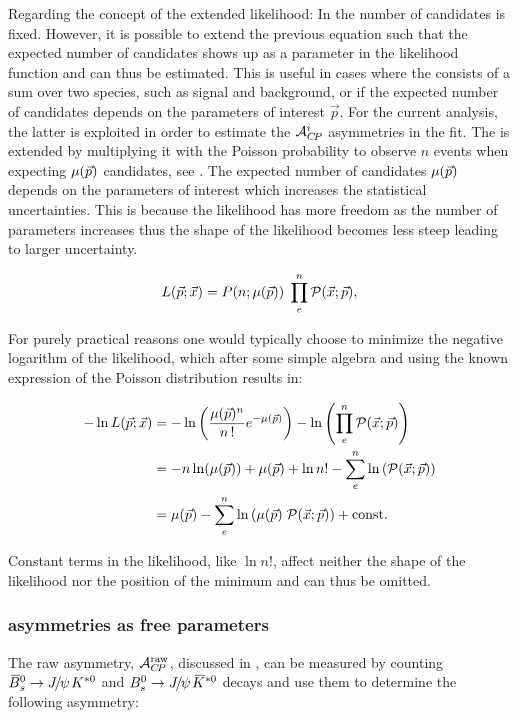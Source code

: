 Regarding the concept of the extended likelihood: In  the number of candidates is fixed.
However, it is possible to extend the previous equation such that the expected number of candidates shows up as a parameter in the likelihood
function and can thus be estimated. This is useful in cases where the \pdf consists of a sum over two species, such as signal and background,
or if the expected number of candidates depends on the parameters of interest $\vec{p}$. For the current analysis, the latter is
exploited in order to estimate the $\mathcal{A}_{C\!P}^{i}$ asymmetries in the fit. The \pdf is extended by multiplying it with the Poisson
probability to observe $n$ events when expecting $\mu({\vec{p}}) $ candidates, see .
The expected number of candidates $\mu({\vec{p}}) $ depends on the
parameters of interest which increases the statistical uncertainties. This is because the likelihood has more freedom
as the number of parameters increases thus the shape of the likelihood becomes less steep leading to larger uncertainty.

\begin{equation}
  \centering
L(\vec{p};\vec{x}) = P(n;\expEvnts) \; \prod_e^n \mathcal{P}(\vec{x};\vec{p}),
\label{extlikelihood}
\end{equation}

For purely practical reasons one would typically choose to minimize the negative logarithm of the likelihood, which after some simple
algebra and using the known expression of the Poisson distribution results in:

\begin{align}
  \centering
  -\nll &= -\ln\left( \frac{\expEvnts^n}{n\,!} e^{-\expEvnts } \right) - \ln\left( \prod_e^n \mathcal{P}(\vec{x};\vec{p}) \right)  \nonumber \\
        &= - n\ln(\expEvnts) + \expEvnts  + \ln n! - \sum_e^n \ln\parenthesis{\mathcal{P}(\vec{x};\vec{p})} \nonumber \\
        &=  \expEvnts  - \sum_e^n \ln\parenthesis{\expEvnts \; \mathcal{P}(\vec{x};\vec{p}) } + {\rm const}.
\label{extloglikelihood}
\end{align}

\noindent Constant terms in the likelihood, like $\ln n!$, affect neither the shape of the likelihood
nor the position of the minimum and can thus be omitted.

\subsubsection{\CP asymmetries as free parameters}
\label{cp_assymetries_and_total_decay_rate}
The raw asymmetry, $\mathcal{A}_{C\!P}^{\rm raw}$, discussed in , can be measured by counting
$\BsbarJpsiKst$ and $\BsJpsiKst$ decays and use them to determine the following asymmetry:

